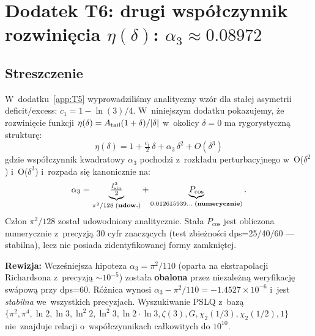 \providecommand{\Ci}{\operatorname{Ci}}
\providecommand{\Si}{\operatorname{Si}}
\providecommand{\Li}{\operatorname{Li}}

\section*{Dodatek T6: drugi wsp\'o\l{}czynnik rozwini\k{e}cia $\eta(\delta)$: $\alpha_3 \approx 0.08972$}%
%
\label{app:T6}

\subsection*{Streszczenie}

W~dodatku~\ref{app:T5} wyprowadzili\'smy analityczny wz\'or dla sta\l{}ej
asymetrii deficit/excess: $c_1 = 1 - \ln(3)/4$. W~niniejszym dodatku
pokazujemy, \.ze rozwini\k{e}cie funkcji $\eta(\delta) = A_{\rm tail}(1+\delta)/|\delta|$
w~okolicy $\delta = 0$ ma rygorystyczn\k{a} struktur\k{e}:
\begin{equation}
  \boxed{\;\eta(\delta) = 1 + \tfrac{c_1}{2}\,\delta + \alpha_3\,\delta^2 + O(\delta^3)\;}
  \label{eq:eta-expansion-full}
\end{equation}
gdzie wsp\'o\l{}czynnik kwadratowy $\alpha_3$ pochodzi z~rozk\l{}adu
perturbacyjnego w~O($\delta^2$) i~O($\delta^3$) i~rozpada si\k{e} kanonicznie na:
\begin{equation}
  \alpha_3 = \underbrace{\tfrac{I_{\sin}^2}{2}}_{\pi^2/128\; \text{(\textbf{udow.})}}
           + \underbrace{P_{\cos}}_{0.012615939\ldots\;\text{(\textbf{numerycznie})}}.
  \label{eq:alpha3-decomp}
\end{equation}
Cz\l{}on $\pi^2/128$ zosta\l{} udowodniony analitycznie. Sta\l{}a $P_{\cos}$
jest obliczona numerycznie z~precyzj\k{a} 30 cyfr znacz\k{a}cych
(test zbie\.zno\'sci dps=25/40/60 --- stabilna), lecz nie posiada
zidentyfikowanej formy zamkni\k{e}tej.

\medskip
\textbf{Rewizja:} Wcze\'sniejsza hipoteza $\alpha_3 = \pi^2/110$ (oparta na
ekstrapolacji Richardsona z~precyzj\k{a} $\sim 10^{-5}$) zosta\l{}a \textbf{obalona}
przez niezale\.zn\k{a} weryfikacj\k{e} sw\'apow\k{a} przy dps=60. R\'o\.znica wynosi
$\alpha_3 - \pi^2/110 = -1.4527 \times 10^{-6}$ i~jest \emph{stabilna}
we~wszystkich precyzjach. Wyszukiwanie PSLQ z~baz\k{a}
$\{\pi^2, \pi^4, \ln 2, \ln 3, \ln^2 2, \ln^2 3, \ln 2\cdot\ln 3,
\zeta(3), G, \chi_2(1/3), \chi_2(1/2), 1\}$ nie~znajduje relacji
o~wsp\'o\l{}czynnikach ca\l{}kowitych do $10^{10}$.

